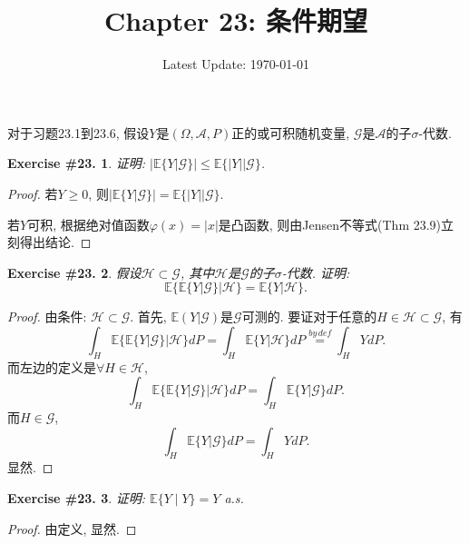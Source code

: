 \documentclass[UTF8, a4paper]{article}
\title{Chapter 23: 条件期望}
\author{}
\date{Latest Update: \today}
\newtheorem{exercise}{Exercise \#23.}
\begin{document}
\maketitle


对于习题23.1到23.6, 假设\(Y\)是\((\Omega, \mathcal{A}, P)\)正的或可积随机变量, \(\mathcal{G}\)是\(\mathcal{A}\)的子\(\sigma\)-代数.

\begin{framed}
\begin{exercise}
证明: \(|\mathbb{E}\{Y|\mathcal{G}\}| \leq \mathbb{E}\{|Y| \mid \mathcal{G}\}\).
\end{exercise}
\end{framed}

\begin{proof}
若\(Y \geq 0\), 则\(|\mathbb{E}\{Y|\mathcal{G}\}| = \mathbb{E}\{|Y| \mid \mathcal{G}\}\).

若\(Y\)可积, 根据绝对值函数\(\varphi(x) = |x|\)是凸函数, 则由Jensen不等式(Thm 23.9)立刻得出结论.
\end{proof}


\begin{framed}
\begin{exercise}
假设\(\mathcal{H} \subset \mathcal{G}\), 其中\(\mathcal{H}\)是\(\mathcal{G}\)的子\(\sigma\)-代数. 证明: $$\mathbb{E}\{\mathbb{E}\{Y|\mathcal{G}\}|\mathcal{H}\} = \mathbb{E}\{Y|\mathcal{H}\}.$$
\end{exercise}
\end{framed}

\begin{proof}
由条件: \(\mathcal{H} \subset \mathcal{G}\).
首先, \(\mathbb{E}(Y|\mathcal{G})\)是\(\mathcal{G}\)可测的.
要证对于任意的\(H \in \mathcal{H} \subset \mathcal{G}\), 有
$$
\int_H \mathbb{E}\{\mathbb{E}\{Y|\mathcal{G}\}|\mathcal{H}\} dP = \int_H \mathbb{E}\{Y|\mathcal{H}\} dP \overset{by\,def}{=} \int_H Y dP.
$$
而左边的定义是\(\forall H \in \mathcal{H}\),
$$
\int_H \mathbb{E}\{\mathbb{E}\{Y|\mathcal{G}\}|\mathcal{H}\} dP = \int_H \mathbb{E}\{Y|\mathcal{G}\} dP.
$$
而\(H \in \mathcal{G}\), 
$$
\int_H \mathbb{E}\{Y|\mathcal{G}\} dP = \int_H Y dP.
$$
显然.
\end{proof}


\begin{framed}
\begin{exercise}
证明: \(\mathbb{E}\{Y\mid Y\} = Y\) a.s.
\end{exercise}
\end{framed}


\begin{proof}
由定义, 显然.
\end{proof}
\end{document}
